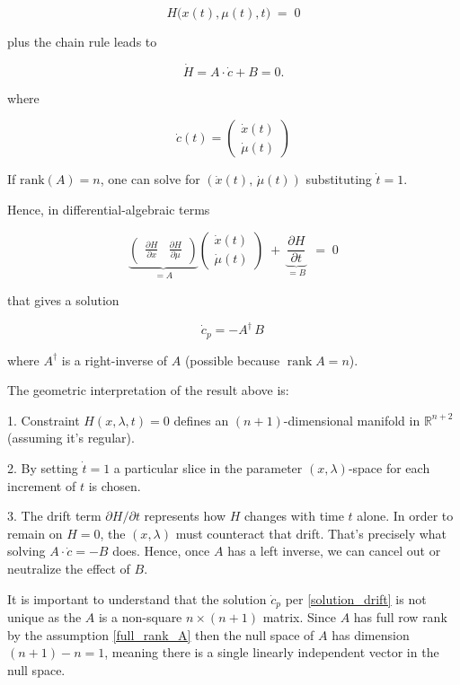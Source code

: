 \documentclass[11pt,american]{article}
\DeclareMathOperator{\rank}{\operatorname{rank}}
\begin{document}
\[
H\bigl(x(t),\mu(t),t\bigr)\;=\;0
\]

plus the chain rule leads to

\[
\dot H = A \cdot \dot c + B = 0.
\]

where

\[
\dot c(t) = \begin{pmatrix} \dot{x}(t) \\ \dot{\mu}(t) \end{pmatrix}
\]
  
If $\mathrm{rank}(A)=n$, one can solve for $(\dot{x}(t),\,\dot{\mu}(t))$ substituting $\dot{t} = 1$.  

Hence, in differential-algebraic terms

\[
\underbrace{\begin{pmatrix}
\frac{\partial H}{\partial x} & \frac{\partial H}{\partial \mu}
\end{pmatrix}}_{=A}
\begin{pmatrix}
\dot{x}(t)\\[4pt]
\dot{\mu}(t)
\end{pmatrix}
\;+\;
\underbrace{\frac{\partial H}{\partial t}}_{=B}\
\;=\;
0
\]

that gives a solution

\begin{equation}\label{solution_drift}
\dot c_p = -A^\dagger\,B\,
\end{equation}

where $A^\dagger$ is a right-inverse of $A$ (possible because $\rank A=n$).

The geometric interpretation of the result above is:

1. Constraint $H(x,\lambda,t)=0$ defines an $(n+1)$-dimensional manifold in $\mathbb{R}^{n+2}$ (assuming it’s regular). 
 
2. By setting $\dot{t}=1$ a particular slice in the parameter $(x,\lambda)$-space for each increment of $t$ is chosen.  

3. The drift term $\partial H/\partial t$ represents how $H$ changes with time $t$ alone. In order to remain on $H=0$, the $(x,\lambda)$ must counteract that drift. That’s precisely what solving $A \cdot \dot c = -B$ does. Hence, once $A$ has a left inverse, we can cancel out or neutralize the effect of $B$.

It is important to understand that the solution $\dot c_p$ per \eqref{solution_drift} is not unique as the $A$ is a non-square $ n \times (n+1) $ matrix.
Since $ A $ has full row rank by the assumption \eqref{full_rank_A} then the null space of $ A $ has dimension $ (n+1) - n = 1 $, meaning there is a single linearly independent vector in the null space. 
\end{document}
